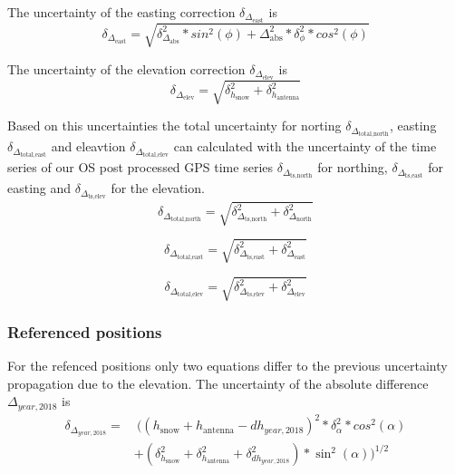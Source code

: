 The uncertainty of the easting correction $\delta_{\Delta_{\text{east}}}$ is
\begin{equation}
	\delta_{\Delta_{\text{east}}} = \sqrt{\delta_{\Delta_{\text{abs}}}^2 * sin^2(\phi) + \Delta_{\text{abs}}^2 * \delta_{\phi}^2 * cos^2(\phi)}
\end{equation}

The uncertainty of the elevation correction $\delta_{\Delta_{\text{elev}}}$ is
\begin{equation}
\delta_{\Delta_{\text{elev}}} = \sqrt{\delta_{h_{\text{snow}}}^2 + \delta_{h_{\text{antenna}}}^2}
\end{equation}
	
Based on this uncertainties the total uncertainty for norting $\delta_{\Delta_{\text{total,north}}}$, easting $\delta_{\Delta_{\text{total,east}}}$ and eleavtion $\delta_{\Delta_{\text{total,elev}}}$ can calculated with the uncertainty of the time series of our OS post processed GPS time series $\delta_{\Delta_{\text{ts,north}}}$ for northing, $\delta_{\Delta_{\text{ts,east}}}$ for easting and $\delta_{\Delta_{\text{ts,elev}}}$ for the elevation.
\begin{equation}
	\delta_{\Delta_{\text{total,north}}} = \sqrt{\delta_{\Delta_{\text{ts,north}}}^2 + \delta_{\Delta_{\text{north}}}^2}
	\label{GPS:eq:errnorth}
\end{equation}

\begin{equation}
	\delta_{\Delta_{\text{total,east}}} = \sqrt{\delta_{\Delta_{\text{ts,east}}}^2 + \delta_{\Delta_{\text{east}}}^2}
	\label{GPS:eq:erreast}
\end{equation}

\begin{equation}
	\delta_{\Delta_{\text{total,elev}}} = \sqrt{\delta_{\Delta_{\text{ts,elev}}}^2 +\delta_{\Delta_{\text{elev}}}^2}
	\label{GPS:eq:errnelev}
\end{equation}

\subsubsection*{Referenced positions}

For the refenced positions only two equations differ to the previous uncertainty propagation due to the elevation. 
The uncertainty of the absolute difference $\Delta_{year,2018}$ is
\begin{equation}
\begin{split}
\delta_{\Delta_{year,2018}} = & 
\ ((h_{\text{snow}} + h_{\text{antenna}} - dh_{year,2018})^2 * \delta_{\alpha}^2 * cos^2(\alpha)\\
&+ (\delta_{h_{\text{snow}}}^2 + \delta_{h_{\text{antenna}}}^2 + \delta_{dh_{year,2018}}^2) * \sin^2(\alpha))^{1/2}
\end{split}
\end{equation}

